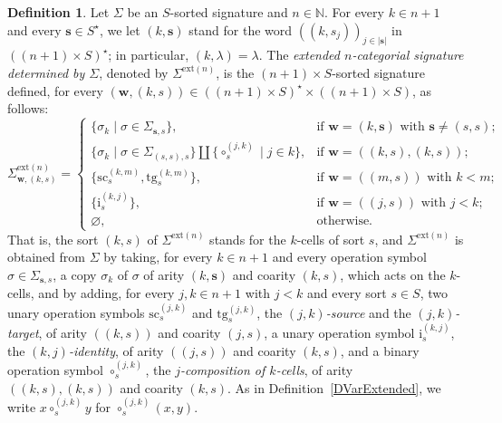 \documentclass{amsart}
\theoremstyle{plain}
\theoremstyle{definition}
\newtheorem{definition}[theorem]{Definition}
\begin{document}
\begin{definition}\label{DSigmaCatExtended}
Let $\Sigma$ be an $S$-sorted signature and $n\in\mathbb{N}$. For every $k\in n+1$ and every $\mathbf{s}\in S^{\star}$, we let $(k,\mathbf{s})$ stand for the word $((k,s_{j}))_{j\in\lvert\mathbf{s}\rvert}$ in $((n+1)\times S)^{\star}$; in particular, $(k,\lambda)=\lambda$. The \emph{extended $n$-categorial signature determined by $\Sigma$}, denoted by $\Sigma^{\mathrm{ext}(n)}$, is the $(n+1)\times S$-sorted signature defined, for every $(\mathbf{w},(k,s))\in((n+1)\times S)^{\star}\times((n+1)\times S)$, as follows:
$$
{\Sigma}^{\mathrm{ext}(n)}_{\mathbf{w},(k,s)}=
\begin{cases}
\{\sigma_{k}\mid\sigma\in{\Sigma}_{\mathbf{s},s}\},
& \text{if $\mathbf{w}=(k,\mathbf{s})$ with $\mathbf{s}\neq(s,s)$;}\\
\{\sigma_{k}\mid\sigma\in{\Sigma}_{(s,s),s}\}\amalg\{\circ^{(j,k)}_{s}\mid j\in k\},
& \text{if $\mathbf{w}=((k,s),(k,s))$;}\\
\{\mathrm{sc}^{(k,m)}_{s}, \mathrm{tg}^{(k,m)}_{s}\},
& \text{if $\mathbf{w}=((m,s))$ with $k<m$;}\\
\{\mathrm{i}^{(k,j)}_{s}\},
& \text{if $\mathbf{w}=((j,s))$ with $j<k$;}\\
\varnothing,
& \text{otherwise.}
\end{cases}
$$
That is, the sort $(k,s)$ of ${\Sigma}^{\mathrm{ext}(n)}$ stands for the $k$-cells of sort $s$, and ${\Sigma}^{\mathrm{ext}(n)}$ is obtained from $\Sigma$ by taking, for every $k\in n+1$ and every operation symbol $\sigma\in\Sigma_{\mathbf{s},s}$, a copy $\sigma_{k}$ of $\sigma$ of arity $(k,\mathbf{s})$ and coarity $(k,s)$, which acts on the $k$-cells, and by adding, for every $j,k\in n+1$ with $j<k$ and every sort $s\in S$, two unary operation symbols $\mathrm{sc}^{(j,k)}_{s}$ and $\mathrm{tg}^{(j,k)}_{s}$, the \emph{$(j,k)$-source} and the \emph{$(j,k)$-target}, of arity $((k,s))$ and coarity $(j,s)$, a unary operation symbol $\mathrm{i}^{(k,j)}_{s}$, the \emph{$(k,j)$-identity}, of arity $((j,s))$ and coarity $(k,s)$, and a binary operation symbol $\circ^{(j,k)}_{s}$, the \emph{$j$-composition of $k$-cells}, of arity $((k,s),(k,s))$ and coarity $(k,s)$. As in Definition~\ref{DVarExtended}, we write $x\circ^{(j,k)}_{s}y$ for $\circ^{(j,k)}_{s}(x,y)$.


\end{definition}
\end{document}
